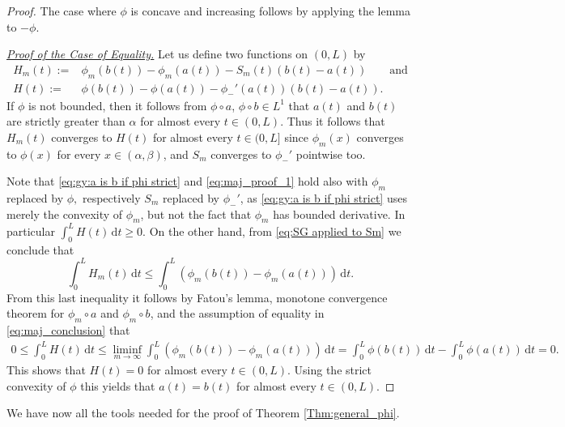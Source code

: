 \documentclass[10pt,leqno]{amsart}
\newcommand{\dd}{\, \mathrm{d}}
\numberwithin{Theorem}{section}
\theoremstyle{definition}
\theoremstyle{remark}
\numberwithin{equation}{section}
\numberwithin{equation}{section}
\begin{document}
\begin{proof}
 The case where $\phi$ is concave and increasing follows  by applying the lemma to $-\phi$. 

\smallskip 

\textit{\underline{Proof of the Case of Equality.}} 
Let us define two functions on $(0,L)$ by 
\begin{align*}
    H_m(t):=& \phi_m(b(t)) - \phi_m(a(t)) - S_m(t) (b(t) - a(t))\qquad\text{and}
    \\
    H(t):=&\phi(b(t)) - \phi(a(t)) - \phi_-'(a(t)) (b(t) - a(t)).
\end{align*}
If $\phi$ is not bounded, then it follows from $\phi\circ a$, $\phi\circ b\in L^1$ that  $a(t)$ and $b(t)$ are strictly greater than $\alpha$ for almost every $t\in(0,L)$. 
Thus it follows that $H_m(t)$ converges to $H(t)$ for almost every $t\in (0,L]$ since $\phi_m(x)$ converges to $\phi(x)$ for every $x\in (\alpha,\beta)$, and  $S_m$ converges to $\phi_-'$ pointwise too. 

Note that \eqref{eq:gy:a is b if phi strict} and \eqref{eq:maj_proof_1} hold also with $\phi_m$ replaced by $\phi,$ respectively $S_m$ replaced by $\phi_-'$, as \eqref{eq:gy:a is b if phi strict} uses merely the convexity of $\phi_m$, but not the fact that $\phi_m$ has bounded derivative. In particular $\int_0^L H(t)\dd t\geq 0$.
On the other hand, from \eqref{eq:SG applied to Sm} we conclude that
$$
  \int_0^L H_m(t)\dd t\leq \int_0^L \left(\phi_m(b(t))-\phi_m(a(t))\right)\dd t.
$$
From this last inequality it follows by Fatou's lemma, monotone convergence theorem for $\phi_m\circ a$ and $\phi_m\circ b$, and the assumption of equality in  \eqref{eq:maj_conclusion} that
\begin{align*}
    0 \leq \int_0^L H(t)\dd t \leq \liminf_{m\to\infty}\int_0^L \left(\phi_m(b(t))-\phi_m(a(t))\right)\dd t=\int_0^L\phi(b(t))\dd t-\int_0^L\phi(a(t))\dd t=0. 
\end{align*}
This shows that $H(t)=0$ for almost every $t\in (0,L).$ Using the strict convexity of $\phi$ this yields that $a(t)=b(t)$ for almost every $t\in (0,L).$ 
\end{proof}


We have now all the tools needed for the proof of Theorem \ref{Thm:general_phi}.
\end{document}
